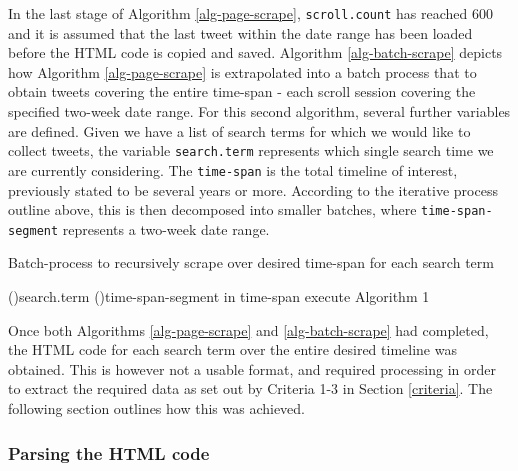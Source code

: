 \documentclass{article}
\begin{document}
\vspace{5mm}

In the last stage of Algorithm \eqref{alg-page-scrape}, \texttt{scroll.count} has reached 600 and it is assumed that the last tweet within the date range has been loaded before the HTML code is copied and saved.
Algorithm \eqref{alg-batch-scrape} depicts how Algorithm \eqref{alg-page-scrape} is extrapolated into a batch process that to obtain tweets covering the entire time-span - each scroll session covering the specified two-week date range. For this second algorithm, several further variables are defined. Given we have a list of search terms for which we would like to collect tweets, the variable \texttt{search.term} represents which single search time we are currently considering. The \texttt{time-span} is the total timeline of interest, previously stated to be several years or more. According to the iterative process outline above, this is then decomposed into smaller batches, where \texttt{time-span-segment} represents a two-week date range.

\vspace{5mm}

\begin{algorithm}[H]
  \caption{Batch-process to recursively scrape over desired time-span for each search term}
  \label{alg-batch-scrape}

  \BlankLine
  \BlankLine

  \BlankLine

  \ForEach(){search.term} {
    \ForEach(){time-span-segment in time-span} {
      execute Algorithm 1\;
    }
  }   
\end{algorithm}

\vspace{5mm}

Once both Algorithms \eqref{alg-page-scrape} and \eqref{alg-batch-scrape} had completed, the HTML code for each search term over the entire desired timeline was obtained. This is however not a usable format, and required processing in order to extract the required data as set out by Criteria 1-3 in Section \ref{criteria}. The following section outlines how this was achieved.


\subsubsection{Parsing the HTML code \label{html-parsing}}
\label{sec-3-3-4}
\end{document}
